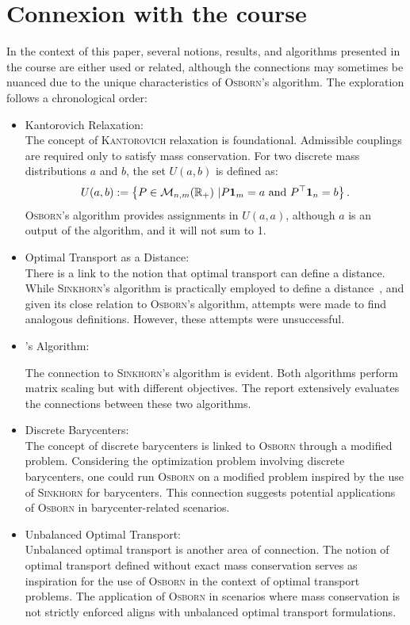 \section{Connexion with the course}

In the context of this paper, several notions, results, and algorithms presented in the course are either used or related, although the connections may sometimes be nuanced due to the unique characteristics of \textsc{Osborn}'s algorithm. The exploration follows a chronological order:

\begin{itemize}
    \item Kantorovich Relaxation:\\
    
    The concept of \textsc{Kantorovich} relaxation is foundational. Admissible couplings are required only to satisfy mass conservation. For two discrete mass distributions \(a\) and \(b\), the set \(U(a,b)\) is defined as:
    \[
    U(a,b) := \left\{P \in \mathcal M_{n,m}(\R_+) \ | P\mathbf{1}_m = a \ \text{and}\ P^\top\mathbf{1}_n = b \right\}.
    \]
    \textsc{Osborn}'s algorithm provides assignments in \(U(a,a)\), although \(a\) is an output of the algorithm, and it will not sum to 1.
    \item Optimal Transport as a Distance:\\
    
    There is a link to the notion that optimal transport can define a distance. While \textsc{Sinkhorn}'s algorithm is practically employed to define a distance~\cite{NIPS2013_af21d0c9, qian2016non}, and given its close relation to \textsc{Osborn}'s algorithm, attempts were made to find analogous definitions. However, these attempts were unsuccessful.
    \item {}'s Algorithm:
    
    The connection to \textsc{Sinkhorn}'s algorithm is evident. Both algorithms perform matrix scaling but with different objectives. The report extensively evaluates the connections between these two algorithms.
    \item Discrete Barycenters:\\
    
    The concept of discrete barycenters is linked to \textsc{Osborn} through a modified problem. Considering the optimization problem involving discrete barycenters, one could run \textsc{Osborn} on a modified problem inspired by the use of \textsc{Sinkhorn} for barycenters. This connection suggests potential applications of \textsc{Osborn} in barycenter-related scenarios.

    \item Unbalanced Optimal Transport:\\
    
    Unbalanced optimal transport is another area of connection. The notion of optimal transport defined without exact mass conservation serves as inspiration for the use of \textsc{Osborn} in the context of optimal transport problems. The application of \textsc{Osborn} in scenarios where mass conservation is not strictly enforced aligns with unbalanced optimal transport formulations.
\end{itemize}


\printbibliography[heading=bibintoc]


